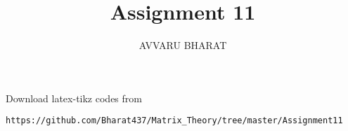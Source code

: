\documentclass[journal,12pt,twocolumn]{IEEEtran}
\DeclareMathOperator*{\Res}{Res}
\begin{document}
\newtheorem{theorem}{Theorem}[section]
\newtheorem{problem}{Problem}
\newtheorem{proposition}{Proposition}[section]
\newtheorem{lemma}{Lemma}[section]
\newtheorem{corollary}[theorem]{Corollary}
\newtheorem{example}{Example}[section]
\newtheorem{definition}[problem]{Definition}

\newcommand{\BEQA}{\begin{eqnarray}}
\newcommand{\EEQA}{\end{eqnarray}}
\newcommand{\define}{\stackrel{\triangle}{=}}

\providecommand{\mbf}{\mathbf}
\providecommand{\pr}[1]{\ensuremath{\Pr\left(#1\right)}}
\providecommand{\qfunc}[1]{\ensuremath{Q\left(#1\right)}}
\providecommand{\sbrak}[1]{\ensuremath{{}\left[#1\right]}}
\providecommand{\lsbrak}[1]{\ensuremath{{}\left[#1\right.}}
\providecommand{\rsbrak}[1]{\ensuremath{{}\left.#1\right]}}
\providecommand{\brak}[1]{\ensuremath{\left(#1\right)}}
\providecommand{\lbrak}[1]{\ensuremath{\left(#1\right.}}
\providecommand{\rbrak}[1]{\ensuremath{\left.#1\right)}}
\providecommand{\cbrak}[1]{\ensuremath{\left\{#1\right\}}}
\providecommand{\lcbrak}[1]{\ensuremath{\left\{#1\right.}}
\providecommand{\rcbrak}[1]{\ensuremath{\left.#1\right\}}}
\theoremstyle{remark}
\newtheorem{rem}{Remark}
\newcommand{\sgn}{\mathop{\mathrm{sgn}}}
\providecommand{\abs}[1]{\left\vert#1\right\vert}
\providecommand{\res}[1]{\Res\displaylimits_{#1}} 
\providecommand{\norm}[1]{\left\lVert#1\right\rVert}
\providecommand{\mtx}[1]{\mathbf{#1}}
\providecommand{\mean}[1]{E\left[ #1 \right]}
\providecommand{\fourier}{\overset{\mathcal{F}}{ \rightleftharpoons}}
\providecommand{\system}{\overset{\mathcal{H}}{ \longleftrightarrow}}
\newcommand{\solution}{\noindent \textbf{Solution: }}
\newcommand{\cosec}{\,\text{cosec}\,}
\providecommand{\dec}[2]{\ensuremath{\overset{#1}{\underset{#2}{\gtrless}}}}
\newcommand{\myvec}[1]{\ensuremath{\begin{pmatrix}#1\end{pmatrix}}}
\newcommand{\mydet}[1]{\ensuremath{\begin{vmatrix}#1\end{vmatrix}}}
\makeatletter
{}
\makeatother
\let\StandardTheFigure\thefigure
\let\vec\mathbf
\renewcommand{\thefigure}{\theproblem}
\def\putbox#1#2#3{\makebox[0in][l]{\makebox[#1][l]{}\raisebox{\baselineskip}[0in][0in]{\raisebox{#2}[0in][0in]{#3}}}}
     \def\rightbox#1{\makebox[0in][r]{#1}}
     \def\centbox#1{\makebox[0in]{#1}}
     \def\topbox#1{\raisebox{-\baselineskip}[0in][0in]{#1}}
     \def\midbox#1{\raisebox{-0.5\baselineskip}[0in][0in]{#1}}
\vspace{3cm}
\title{Assignment 11}
\author{AVVARU BHARAT}
\maketitle
\newpage
\bigskip
\renewcommand{\thefigure}{\theenumi}
\renewcommand{\thetable}{\theenumi}
Download latex-tikz codes from 
%
\begin{lstlisting}
https://github.com/Bharat437/Matrix_Theory/tree/master/Assignment11
\end{lstlisting}
%
\end{document}
